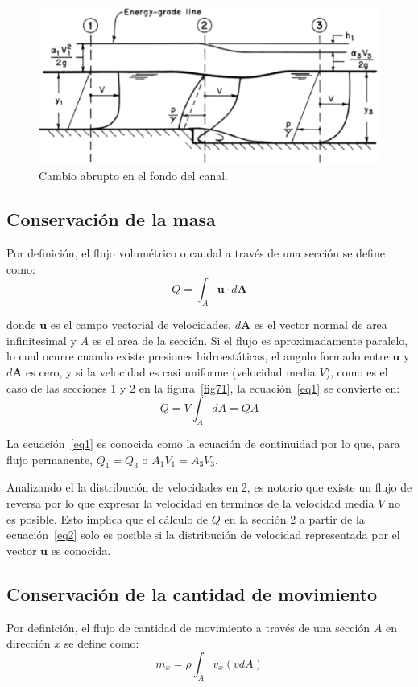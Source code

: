 \documentclass[11pt, oneside]{article}
\begin{document}
\begin{figure}[h]
    \centering
    \includegraphics[width=0.8\linewidth]{fig71.png}
    \caption{Cambio abrupto en el fondo del canal.}
    \label{fig72}
\end{figure}

\subsection{Conservaci\'on de la masa}
Por definici\'on, el flujo volum\'etrico o caudal a trav\'es de una secci\'on se define como:
\begin{equation}
    Q = \int_A \mathbf{u} \cdot d\mathbf{A}
\label{eq1}
\end{equation}

donde $\mathbf{u}$ es el campo vectorial de velocidades, $d\mathbf{A}$ es el vector normal de area infinitesimal y $A$ es el area de la secci\'on. Si el flujo es aproximadamente paralelo, lo cual ocurre cuando existe presiones hidroest\'aticas, el angulo formado entre $\mathbf{u}$ y $d\mathbf{A}$ es cero, y si la velocidad es casi uniforme (velocidad media $V$), como es el caso de las secciones 1 y 2 en la figura~\ref{fig71}, la ecuaci\'on~\ref{eq1} se convierte en:
\begin{equation}
    Q = V \int_A  dA = QA
\label{eq2}
\end{equation}

La ecuaci\'on~\ref{eq1} es conocida como la ecuaci\'on de continuidad por lo que, para flujo permanente, $Q_1 = Q_3$ o $A_1 V_1  = A_3 V_3$. 

Analizando el la distribuci\'on de velocidades en 2, es notorio que existe un flujo de reversa por lo que expresar la velocidad en terminos de la velocidad media $V$ no es posible. Esto implica que el c\'alculo de $Q$ en la secci\'on 2 a partir de la ecuaci\'on~\ref{eq2} solo es posible si la distribuci\'on de velocidad representada por el vector $\mathbf{u}$  es conocida. 


\subsection{Conservaci\'on de la cantidad de movimiento}
Por definici\'on, el flujo de cantidad de movimiento  a trav\'es de una secci\'on $A$ en direcci\'on $x$ se define como: 
\begin{equation}
    m_x = \rho \int_A v_x \left( v dA \right)
\label{eq3}
\end{equation}
\end{document}
